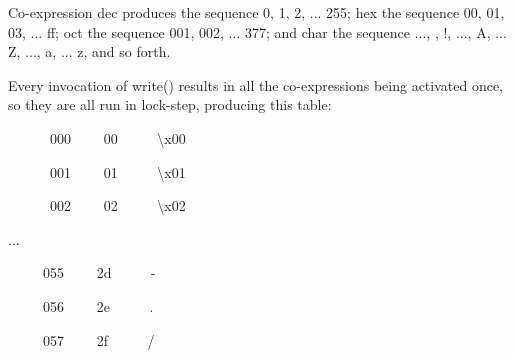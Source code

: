 
Co-expression \textsf{dec} produces the sequence 0, 1, 2, ... 255;
\textsf{hex} the sequence \textsf{{\textquotedbl}00{\textquotedbl}},
\textsf{{\textquotedbl}01{\textquotedbl}},
\textsf{{\textquotedbl}03{\textquotedbl}}, ...
\textsf{{\textquotedbl}ff{\textquotedbl}}; \textsf{oct}\textsf{ }the
sequence \textsf{{\textquotedbl}001{\textquotedbl}},
\textsf{{\textquotedbl}002{\textquotedbl}}, ...
\textsf{{\textquotedbl}377{\textquotedbl}}; and \textsf{char}\textsf{
}the sequence ..., \textsf{{\textquotedbl} {\textquotedbl}},
\textsf{{\textquotedbl}!{\textquotedbl}}, ...,
\textsf{{\textquotedbl}A{\textquotedbl}}, ...
\textsf{{\textquotedbl}Z{\textquotedbl}}, ...,
\textsf{{\textquotedbl}a{\textquotedbl}}, ...
\textsf{{\textquotedbl}z{\textquotedbl}}, and so forth.

Every invocation of \textsf{write()} results in all the co-expressions
being activated once, so they are all run in lock-step, producing this
table:

{ \ \ \ \ \ \ 000 \ \ \ \ 00
\ \ \ \ \ {\textquotedbl}{\textbackslash}x00{\textquotedbl}}

{ \ \ \ \ \ \ 001 \ \ \ \ 01
\ \ \ \ \ {\textquotedbl}{\textbackslash}x01{\textquotedbl}}

{ \ \ \ \ \ \ 002 \ \ \ \ 02
\ \ \ \ \ {\textquotedbl}{\textbackslash}x02{\textquotedbl}}

{\sffamily
...}

{ \ \ \ \ \ 055 \ \ \ \ 2d \ \ \ \ \ {\textquotedbl}-{\textquotedbl}}

{ \ \ \ \ \ 056 \ \ \ \ 2e \ \ \ \ \ {\textquotedbl}.{\textquotedbl}}

{ \ \ \ \ \ 057 \ \ \ \ 2f \ \ \ \ \ {\textquotedbl}/{\textquotedbl}}

